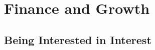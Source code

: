          \chapter{Finance and Growth}
    \setcounter{figure}{1}
    \setcounter{subfigure}{1}
    \label{5925cb6120ab0c0f7c78bd2516b027ff}
    
    
    
    
       
%     
%     
%     
%     
%     
%     
%   
      \label{m39332*cid4}
            \section{ Being Interested in Interest}
            \nopagebreak
                     
